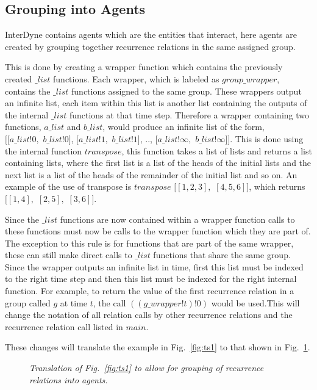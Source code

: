 \documentclass{article}
\begin{document}
\subsection{Grouping into Agents}
InterDyne contains agents which are the entities that interact, here agents are created by grouping together recurrence relations in the same assigned group.  

This is done by creating a wrapper function which contains the previously created $\_list$ functions. Each wrapper, which is labeled as $group\_wrapper$, contains the $\_list$ functions assigned to the same group. These wrappers output an infinite list, each item within this list is another list containing the outputs of the internal $\_list$ functions at that time step. Therefore a wrapper containing two functions, $a\_list$ and $b\_list$, would produce an infinite list of the form,\\
$[[a\_list!0,$ $b\_list!0]$, $[a\_list!1,$ $b\_list!1]$, .., $[a\_list!\infty,$ $b\_list!\infty]]$. This is done using the internal function $transpose$, this function takes a list of lists and returns a list containing lists, where the first list is a list of the heads of the initial lists and the next list is a list of the heads of the remainder of the initial list and so on. An example of the use of transpose is $transpose$ $[[1,2,3],$ $[4,5,6]]$, which returns $[[1,4],$ $[2,5],$ $[3,6]]$.

Since the $\_list$ functions are now contained within a wrapper function calls to these functions must now be calls to the wrapper function which they are part of. The exception to this rule is for functions that are part of the same wrapper, these can still make direct calls to $\_list$ functions that share the same group. Since the wrapper outputs an infinite list in time, first this list must be indexed to the right time step and then this list must be indexed for the right internal function. For example, to return the value of the first recurrence relation in a group called $g$ at time $t$, the call $((g\_wrapper!t)!0)$ would be used.This will change the notation of all relation calls by other recurrence relations and the recurrence relation call listed in $main$. 

These changes will translate the example in Fig.~\ref{fig:ts1} to that shown in Fig.~\ref{fig:ts2}.
\begin{figure}[H]
	\centering
	
	\caption{\it Translation of Fig.~\ref{fig:ts1} to allow for grouping of recurrence relations into agents.  }
	\label{fig:ts2}
\end{figure} 
\end{document}
